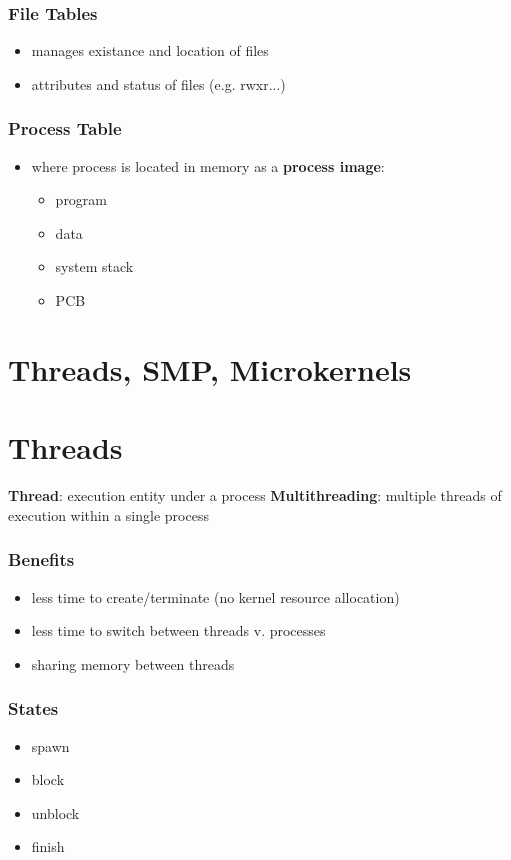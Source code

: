 \documentclass[]{article}
\theoremstyle{definition}
\begin{document}
			\subsubsection{File Tables}
				\begin{itemize}
					\item manages existance and location of files
					\item attributes and status of files (e.g. rwxr...)
				\end{itemize}
			\subsubsection{Process Table}
				\begin{itemize}
					\item where process is located in memory as a \textbf{process image}:
					\begin{itemize}
						\item program
						\item data
						\item system stack
						\item PCB
					\end{itemize}
				\end{itemize}
	\section{Threads, SMP, Microkernels}
		\section{Threads}
			\textbf{Thread}: execution entity under a process
			\textbf{Multithreading}: multiple threads of execution within a single process
			\subsubsection{Benefits}
				\begin{itemize}
					\item less time to create/terminate (no kernel resource allocation)
					\item less time to switch between threads v. processes
					\item sharing memory between threads
				\end{itemize}
			\subsubsection{States}
				\begin{itemize}
					\item spawn
					\item block
					\item unblock
					\item finish
				\end{itemize}
\end{document}
